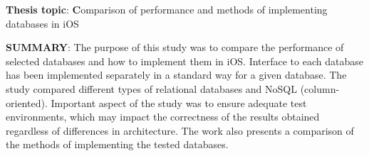 \textbf{Thesis topic}: \textbf Comparison of performance and methods of implementing databases in iOS\par
\textbf{SUMMARY}: The purpose of this study was to compare the performance of selected databases and how to implement them in iOS. Interface to each database has been implemented separately in a standard way for a given database. The study compared different types of relational databases and NoSQL (column-oriented). Important aspect of the study was to ensure adequate test environments, which may impact the correctness of the results obtained regardless of differences in architecture. The work also presents a comparison of the methods of implementing the tested databases.